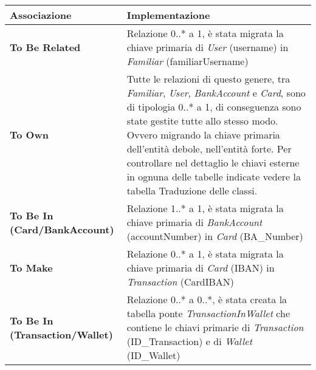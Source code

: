 \begin{longtable}{m{6.7cm}|m{7cm}}

    \rowcolor{black!10}
    \textbf{Associazione} & \textbf{Implementazione} \\ \hline
    \endhead

    \textbf{To Be Related} &
    Relazione 0..* a 1, è stata migrata la chiave primaria di \textit{User} (username) in \textit{Familiar} (familiarUsername) \\ \hline

    \textbf{To Own} &
    Tutte le relazioni di questo genere, tra \textit{Familiar}, \textit{User}, \textit{BankAccount} e \textit{Card}, sono di tipologia 0..* a 1,
    di conseguenza sono state gestite tutte allo stesso modo. Ovvero migrando la chiave primaria dell'entità debole, nell'entità forte.
    Per controllare nel dettaglio le chiavi esterne in ognuna delle tabelle indicate vedere la tabella Traduzione delle classi. \\ \hline

    \textbf{To Be In (Card/BankAccount)} &
    Relazione 1..* a 1, è stata migrata la chiave primaria di \textit{BankAccount} (accountNumber) in \textit{Card} (BA\_Number) \\ \hline

    \textbf{To Make} &
    Relazione 0..* a 1, è stata migrata la chiave primaria di \textit{Card} (IBAN) in \textit{Transaction} (CardIBAN) \\ \hline

    \textbf{To Be In (Transaction/Wallet)} &
    Relazione 0..* a 0..*, è stata creata la tabella ponte \textit{TransactionInWallet} che contiene le chiavi primarie di \textit{Transaction} (ID\_Transaction) e di \textit{Wallet} (ID\_Wallet) \\ \hline

\end{longtable}